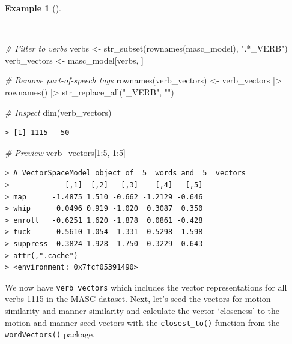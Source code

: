 \documentclass[
  letterpaper,
  DIV=11,
  numbers=noendperiod]{scrreport}
\newenvironment{Shaded}{\begin{snugshade}}{\end{snugshade}}
\newcommand{\CommentTok}[1]{\textcolor[rgb]{0.00,0.00,0.00}{\textit{#1}}}
\newcommand{\DecValTok}[1]{\textcolor[rgb]{0.00,0.00,0.00}{#1}}
\newcommand{\FunctionTok}[1]{\textcolor[rgb]{0.00,0.00,0.00}{#1}}
\newcommand{\NormalTok}[1]{\textcolor[rgb]{0.00,0.00,0.00}{#1}}
\newcommand{\OtherTok}[1]{\textcolor[rgb]{0.00,0.00,0.00}{#1}}
\newcommand{\SpecialCharTok}[1]{\textcolor[rgb]{0.00,0.00,0.00}{#1}}
\newcommand{\StringTok}[1]{\textcolor[rgb]{0.00,0.00,0.00}{#1}}
\theoremstyle{definition}
\newtheorem{example}{Example}[chapter]
\theoremstyle{remark}
\begin{document}
\begin{example}[]\protect\hypertarget{exm-eda-masc-vsm-word2vec-verbs}{}\label{exm-eda-masc-vsm-word2vec-verbs}

~

\begin{Shaded}
\begin{Highlighting}[]
\CommentTok{\# Filter to verbs}
\NormalTok{verbs }\OtherTok{\textless{}{-}} \FunctionTok{str\_subset}\NormalTok{(}\FunctionTok{rownames}\NormalTok{(masc\_model), }\StringTok{".*\_VERB"}\NormalTok{)}
\NormalTok{verb\_vectors }\OtherTok{\textless{}{-}}\NormalTok{ masc\_model[verbs, ]}

\CommentTok{\# Remove part{-}of{-}speech tags}
\FunctionTok{rownames}\NormalTok{(verb\_vectors) }\OtherTok{\textless{}{-}} 
\NormalTok{  verb\_vectors }\SpecialCharTok{|\textgreater{}}
  \FunctionTok{rownames}\NormalTok{() }\SpecialCharTok{|\textgreater{}}
  \FunctionTok{str\_replace\_all}\NormalTok{(}\StringTok{"\_VERB"}\NormalTok{, }\StringTok{""}\NormalTok{)}

\CommentTok{\# Inspect}
\FunctionTok{dim}\NormalTok{(verb\_vectors)}
\end{Highlighting}
\end{Shaded}

\begin{verbatim}
> [1] 1115   50
\end{verbatim}

\begin{Shaded}
\begin{Highlighting}[]
\CommentTok{\# Preview}
\NormalTok{verb\_vectors[}\DecValTok{1}\SpecialCharTok{:}\DecValTok{5}\NormalTok{, }\DecValTok{1}\SpecialCharTok{:}\DecValTok{5}\NormalTok{]}
\end{Highlighting}
\end{Shaded}

\begin{verbatim}
> A VectorSpaceModel object of  5  words and  5  vectors
>             [,1]  [,2]   [,3]    [,4]   [,5]
> map      -1.4875 1.510 -0.662 -1.2129 -0.646
> whip      0.0496 0.919 -1.020  0.3087  0.350
> enroll   -0.6251 1.620 -1.878  0.0861 -0.428
> tuck      0.5610 1.054 -1.331 -0.5298  1.598
> suppress  0.3824 1.928 -1.750 -0.3229 -0.643
> attr(,".cache")
> <environment: 0x7fcf05391490>
\end{verbatim}

\end{example}

We now have \texttt{verb\_vectors} which includes the vector
representations for all verbs 1115 in the MASC dataset. Next, let's seed
the vectors for motion-similarity and manner-similarity and calculate
the vector `closeness' to the motion and manner seed vectors with the
\texttt{closest\_to()} function from the \texttt{wordVectors()} package.
\end{document}
